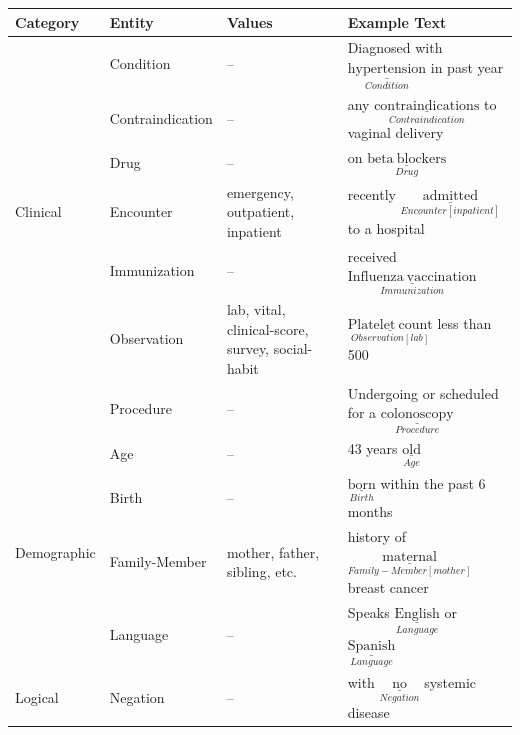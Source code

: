 \documentclass[fleqn,10pt]{wlscirep}
\begin{document}
\begin{table}
    \def\arraystretch{1.3}
\begin{tabular}{m{2cm} m{2.5cm} m{4.9cm} m{6.5cm}}
    \toprule
    \textbf{Category} & \textbf{Entity} & \textbf{Values} & \textbf{Example Text}\\
    \hline 
    &
        Condition 
            & --  
            & Diagnosed with $\underset{Condition}{\underline{\mathrm{hypertension}}}$ in past year \\
     & Contraindication
            & --
            & any $\underset{Contraindication}{\underline{\mathrm{contraindications}}}$ to vaginal delivery \\
     & Drug 
            & -- 
            & on $\underset{Drug}{\underline{\mathrm{beta\ blockers}}}$ \\
     Clinical & Encounter 
            & emergency, outpatient, inpatient 
            & recently $\underset{Encounter[inpatient]}{\underline{\mathrm{admitted}}}$ to a hospital \\
     & Immunization 
            & --
            & received $\underset{Immunization}{\underline{\mathrm{Influenza\ vaccination}}}$ \\
     & Observation
            & lab, vital, clinical-score, survey, social-habit
            & $\underset{Observation[lab]}{\underline{\mathrm{Platelet\ count}}}$ less than 500 \\
     & Procedure
            & -- 
            & Undergoing or scheduled for a $\underset{Procedure}{\underline{\mathrm{colonoscopy}}}$ \\[2ex]
    \hline       
    \multirow{4}{}[-8pt]{\mbox{Demographic}} & 
        Age 
            & -- 
            & 43 years $\underset{Age}{\underline{\mathrm{old}}}$ \\
     & Birth
            & --
            & $\underset{Birth}{\underline{\mathrm{born}}}$ within the past 6 months \\
     & Family-Member 
            & mother, father, sibling, etc.
            & history of $\underset{Family-Member[mother]}{\underline{\mathrm{maternal}}}$ breast cancer \\
     & Language 
            & -- 
            & Speaks $\underset{Language}{\underline{\mathrm{English}}}$ or $\underset{Language}{\underline{\mathrm{Spanish}}}$  \\[2ex]
    \hline
    Logical &
       Negation 
            & -- 
            & with $\underset{Negation}{\underline{\mathrm{no}}}$ systemic disease \\
            

\end{tabular}
\end{table}
\end{document}
